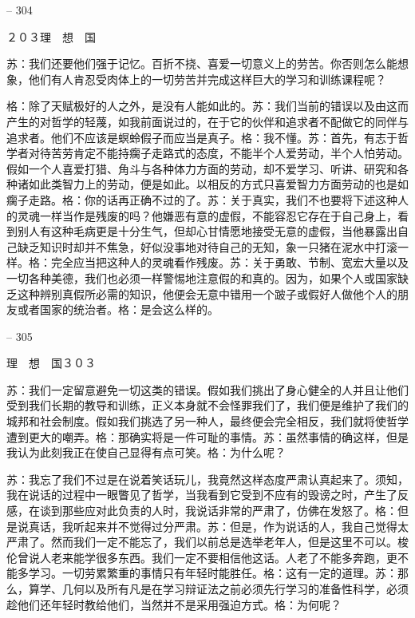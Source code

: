 \documentclass[11pt,oneside]{book}
\begin{document}
\begin{common-format}
    

-- 304

    ２０３理　想　国

    苏：我们还要他们强于记忆。百折不挠、喜爱一切意义上的劳苦。你否则怎么能想象，他们有人肯忍受肉体上的一切劳苦并完成这样巨大的学习和训练课程呢？

    格：除了天赋极好的人之外，是没有人能如此的。苏：我们当前的错误以及由这而产生的对哲学的轻蔑，如我前面说过的，在于它的伙伴和追求者不配做它的同伴与追求者。他们不应该是螟蛉假子而应当是真子。格：我不懂。苏：首先，有志于哲学者对待苦劳肯定不能持瘸子走路式的态度，不能半个人爱劳动，半个人怕劳动。假如一个人喜爱打猎、角斗与各种体力方面的劳动，却不爱学习、听讲、研究和各种诸如此类智力上的劳动，便是如此。以相反的方式只喜爱智力方面劳动的也是如瘸子走路。格：你的话再正确不过的了。苏：关于真实，我们不也要将下述这种人的灵魂一样当作是残废的吗？他嫌恶有意的虚假，不能容忍它存在于自己身上，看到别人有这种毛病更是十分生气，但却心甘情愿地接受无意的虚假，当他暴露出自己缺乏知识时却并不焦急，好似没事地对待自己的无知，象一只猪在泥水中打滚一样。格：完全应当把这种人的灵魂看作残废。苏：关于勇敢、节制、宽宏大量以及一切各种美德，我们也必须一样警惕地注意假的和真的。因为，如果个人或国家缺乏这种辨别真假所必需的知识，他便会无意中错用一个跛子或假好人做他个人的朋友或者国家的统治者。格：是会这么样的。

    

-- 305

    理　想　国３０３

    苏：我们一定留意避免一切这类的错误。假如我们挑出了身心健全的人并且让他们受到我们长期的教导和训练，正义本身就不会怪罪我们了，我们便是维护了我们的城邦和社会制度。假如我们挑选了另一种人，最终便会完全相反，我们就将使哲学遭到更大的嘲弄。格：那确实将是一件可耻的事情。苏：虽然事情的确这样，但是我认为此刻我正在使自己显得有点可笑。格：为什么呢？

    苏：我忘了我们不过是在说着笑话玩儿，我竟然这样态度严肃认真起来了。须知，我在说话的过程中一眼瞥见了哲学，当我看到它受到不应有的毁谤之时，产生了反感，在谈到那些应对此负责的人时，我说话非常的严肃了，仿佛在发怒了。格：但是说真话，我听起来并不觉得过分严肃。苏：但是，作为说话的人，我自己觉得太严肃了。然而我们一定不能忘了，我们以前总是选举老年人，但是这里不可以。梭伦曾说人老来能学很多东西。我们一定不要相信他这话。人老了不能多奔跑，更不能多学习。一切劳累繁重的事情只有年轻时能胜任。格：这有一定的道理。苏：那么，算学、几何以及所有凡是在学习辩证法之前必须先行学习的准备性科学，必须趁他们还年轻时教给他们，当然并不是采用强迫方式。格：为何呢？

    


\end{common-format}
\end{document}
